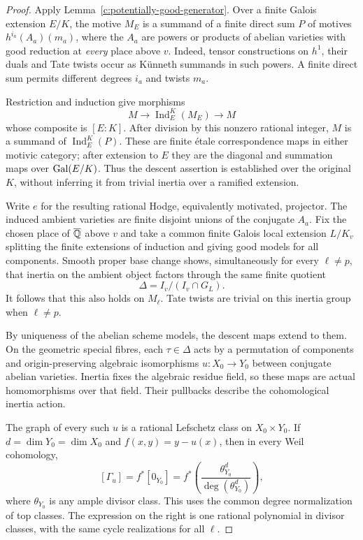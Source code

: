 \begin{proof}
Apply Lemma~\ref{c:potentially-good-generator}.  Over a finite Galois
extension $E/K$, the motive $M_E$ is a summand of a finite direct sum $P$
of motives $h^{i_a}(A_a)(m_a)$, where the $A_a$ are powers or products of
abelian varieties with good reduction at \emph{every} place above $v$.
Indeed, tensor constructions on $h^1$, their duals and Tate twists occur
as K\"unneth summands in such powers.  A finite direct sum permits different
degrees $i_a$ and twists $m_a$.

Restriction and induction give morphisms
\[
 M\longrightarrow\operatorname{Ind}_E^K(M_E)\longrightarrow M
\]
whose composite is $[E:K]$.  After division by this nonzero rational
integer, $M$ is a summand of $\operatorname{Ind}_E^K(P)$.
These are finite \'etale correspondence maps in either motivic category;
after extension to $E$ they are the diagonal and summation maps over
$\operatorname{Gal}(E/K)$.  Thus the descent assertion is established over the original
$K$, without inferring it from trivial inertia over a ramified extension.

Write $e$ for the resulting rational Hodge, equivalently motivated,
projector.  The induced ambient varieties are finite disjoint unions of
the conjugate $A_a$.  Fix the chosen place of $\overline{\mathbb Q}$ above $v$ and
take a common finite Galois local extension $L/K_v$ splitting the finite
extensions of induction and giving good models for all components.
Smooth proper base change shows, simultaneously for every $\ell\ne p$,
that inertia on the ambient object factors through the same finite
quotient
\[
 \Delta=I_v/(I_v\cap G_L).
\]
It follows that this also holds on $M_\ell$.  Tate twists are trivial on
this inertia group when $\ell\ne p$.

By uniqueness of the abelian scheme models, the descent maps extend to
them.  On the geometric special fibres, each $\tau\in\Delta$ acts by a
permutation of components and origin-preserving algebraic isomorphisms
$u:X_0\to Y_0$ between conjugate abelian varieties.  Inertia fixes the
algebraic residue field, so these maps are actual homomorphisms over that
field.  Their pullbacks describe the cohomological inertia action.

The graph of every such $u$ is a rational Lefschetz class on $X_0\times Y_0$.
If $d=\dim Y_0=\dim X_0$ and $f(x,y)=y-u(x)$, then in every Weil
cohomology,
\begin{equation}
\label{c:inertia-graph-lefschetz}
 [\Gamma_u]=f^*[0_{Y_0}]
   =f^*\left(\frac{\theta_{Y_0}^{d}}
                         {\deg(\theta_{Y_0}^{d})}\right),
\end{equation}
where $\theta_{Y_0}$ is any ample divisor class.  This uses the common
degree normalization of top classes.  The expression on the right is one
rational polynomial in divisor classes, with the same cycle realizations
for all $\ell$.


\end{proof}
